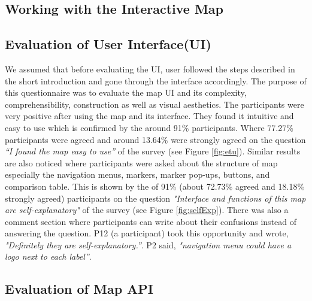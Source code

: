 \subsection{Working with the Interactive Map}

\subsection*{Evaluation of User Interface(UI)}

We assumed that before evaluating the UI, user followed the steps described in the short introduction and gone through the interface accordingly. The purpose of this questionnaire was to evaluate the map UI and its complexity, comprehensibility, construction as well as visual aesthetics. The participants were very positive after using the map and its interface. They found it intuitive and easy to use which is confirmed by the around 91\% participants. Where 77.27\% participants were agreed and around 13.64\% were strongly agreed on the question \textit{“I found the map easy to use”} of the survey (see Figure \ref{fig:etu}). Similar results are also noticed where participants were asked about the structure of map especially the navigation menus, markers, marker pop-ups, buttons, and comparison table. This is shown by the of 91\% (about 72.73\% agreed and 18.18\% strongly agreed) participants on the question \textit{"Interface and functions of this map are self-explanatory"} of the survey (see Figure \ref{fig:selfExp}). There was also a comment section where participants can write about their confusions instead of answering the question. P12 (a participant) took this opportunity and wrote, \textit{"Definitely they are self-explanatory.”}. P2 said, \textit{"navigation menu could have a logo next to each label”}.

\subsection*{Evaluation of Map API}

